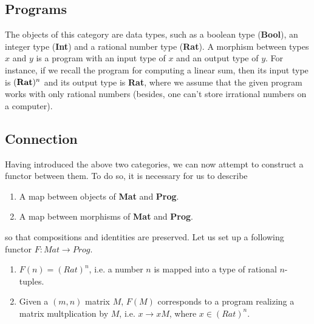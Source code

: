 \documentclass{report}
\theoremstyle{definition}
\begin{document}
\subsection*{Programs}
The objects of this category are data types, such as a boolean type (\textbf{Bool}), an integer type (\textbf{Int}) and a rational number type (\textbf{Rat}). A morphism between types $x$ and $y$ is a program with an input type of $x$ and an output type of $y$. For instance, if we recall the program for computing a linear sum, then its input type is $(\text{\textbf{Rat}})^n$ and its output type is \textbf{Rat}, where we assume that the given program works with only rational numbers (besides, one can't store irrational numbers on a computer).

\subsection*{Connection}
Having introduced the above two categories, we can now attempt to construct a functor between them. To do so, it is necessary for us to describe 
\begin{enumerate}
	\item A map between objects of \textbf{Mat} and \textbf{Prog}.
	\item A map between morphisms of \textbf{Mat} and \textbf{Prog}.
\end{enumerate}
so that compositions and identities are preserved. Let us set up a following functor $F:Mat \to Prog$.
\begin{enumerate}
	\item $F(n) = (Rat)^n$, i.e. a number $n$ is mapped into a type of rational $n$-tuples.
	\item Given a $(m,n)$ matrix $M$, $F(M)$ corresponds to a program realizing a matrix multplication by $M$, i.e. $x\to xM$, where $x\in (Rat)^n$.
\end{enumerate}
\end{document}
